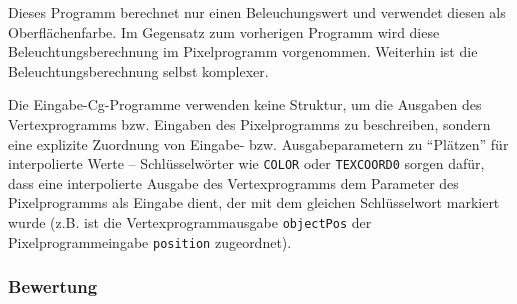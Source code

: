 \documentclass[twoside,a4paper,fleqn,12pt]{book}
\begin{document}

Dieses Programm berechnet nur einen Beleuchungswert und verwendet diesen als Oberflächenfarbe. Im Gegensatz zum
vorherigen Programm wird diese Beleuchtungsberechnung im Pixelprogramm vorgenommen.
Weiterhin ist die Beleuchtungsberechnung selbst komplexer.

{}

{}

Die Eingabe-Cg-Programme verwenden keine Struktur, um die Ausgaben des Vertexprogramms bzw. Eingaben
des Pixelprogramms zu beschreiben, sondern eine explizite Zuordnung von Eingabe- bzw. Ausgabeparametern
zu "`Plätzen"' für interpolierte Werte -- Schlüsselwörter wie \texttt{COLOR} oder \texttt{TEXCOORD0} sorgen dafür,
dass eine interpolierte Ausgabe des Vertexprogramms dem Parameter des Pixelprogramms als Eingabe dient,
der mit dem gleichen Schlüsselwort markiert wurde (z.B. ist die Vertexprogrammausgabe \texttt{objectPos}
der Pixelprogrammeingabe \texttt{position} zugeordnet).

{}

{}

\subsubsection*{Bewertung}
\end{document}
